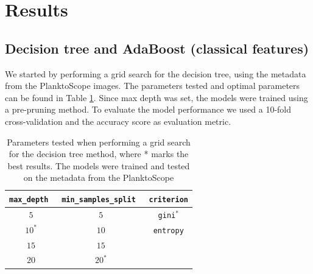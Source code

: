 \section{Results}\label{sec:results}
%
\subsection{Decision tree and AdaBoost (classical features)}
We started by performing a grid search for the decision tree, using the metadata from the PlanktoScope images. The parameters tested and optimal parameters can be found in Table \ref{tab:params_tree}. Since max depth was set, the models were trained using a pre-pruning method. To evaluate the model performance we used a 10-fold cross-validation and the accuracy score as evaluation metric.
\begin{table}[h]
    \centering
    \begin{tabular}{ccc}
        \hline
        \verb|max_depth| \, & \verb|min_samples_split| \, & \verb|criterion| \\
        \hline 
        $5$ & $5$ & \verb|gini|$^*$ \\
        $10^*$ & $10$ & \verb|entropy| \\
        $15$ & $15$ & \\
        $20$ & $20^*$ & \\
        \hline
    \end{tabular}
    \caption{Parameters tested when performing a grid search for the decision tree method, where * marks the best results. The models were trained and tested on the metadata from the PlanktoScope}
    \label{tab:params_tree}
\end{table}

